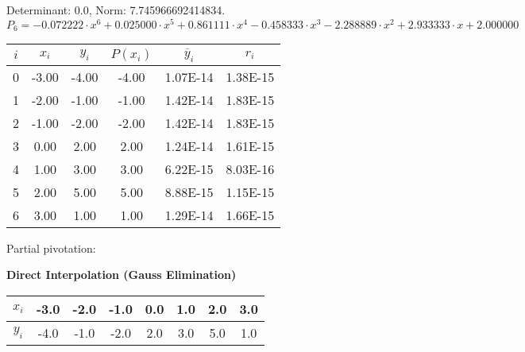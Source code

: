 \documentclass{report}[10pts]
\begin{document}
Determinant:
0.0,
Norm:
7.745966692414834.
\[
   P_{6}=
   -0.072222\cdot x^{6} +0.025000\cdot x^{5} +0.861111\cdot x^{4} -0.458333\cdot x^{3} -2.288889\cdot x^{2} +2.933333\cdot x +2.000000
\]
\begin{center}\begin{tabular}{|c|c|c|c|c|c|}
   \hline
   $i$ & $x_i$ & $y_i$ & $P(x_i)$ & $\overline{y}_i$ & $r_i$\\
   \hline
   0 & -3.00 & -4.00 & -4.00 & 1.07E-14 & 1.38E-15\\
   \hline
   1 & -2.00 & -1.00 & -1.00 & 1.42E-14 & 1.83E-15\\
   \hline
   2 & -1.00 & -2.00 & -2.00 & 1.42E-14 & 1.83E-15\\
   \hline
   3 & 0.00 & 2.00 & 2.00 & 1.24E-14 & 1.61E-15\\
   \hline
   4 & 1.00 & 3.00 & 3.00 & 6.22E-15 & 8.03E-16\\
   \hline
   5 & 2.00 & 5.00 & 5.00 & 8.88E-15 & 1.15E-15\\
   \hline
   6 & 3.00 & 1.00 & 1.00 & 1.29E-14 & 1.66E-15\\
   \hline
\end{tabular}\end{center}

Partial pivotation:
   \begin{center}
   \textbf{\Large{Direct Interpolation (Gauss Elimination)}}
   \end{center}
\begin{center}\begin{tabular}{|c|c|c|c|c|c|c|c|}
   \hline
   $x_i$ & -3.0 & -2.0 & -1.0 & 0.0 & 1.0 & 2.0 & 3.0\\
   \hline
   $y_i$ & -4.0 & -1.0 & -2.0 & 2.0 & 3.0 & 5.0 & 1.0\\
   \hline
\end{tabular}\end{center}
\end{document}
